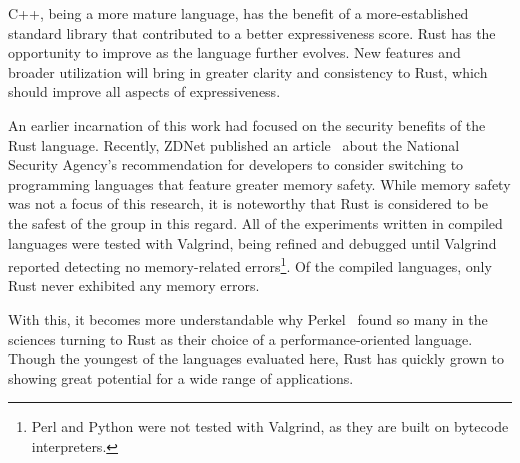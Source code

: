 C++, being a more mature language, has the benefit of a more-established standard library that contributed to a better expressiveness score. Rust has the opportunity to improve as the language further evolves. New features and broader utilization will bring in greater clarity and consistency to Rust, which should improve all aspects of expressiveness. 

An earlier incarnation of this work had focused on the security benefits of the Rust language. Recently, ZDNet published an article~\cite{tung} about the National Security Agency's recommendation for developers to consider switching to programming languages that feature greater memory safety. While memory safety was not a focus of this research, it is noteworthy that Rust is considered to be the safest of the group in this regard. All of the experiments written in compiled languages were tested with Valgrind, being refined and debugged until Valgrind reported detecting no memory-related errors\footnote{Perl and Python were not tested with Valgrind, as they are built on bytecode interpreters.}. Of the compiled languages, only Rust never exhibited any memory errors.

With this, it becomes more understandable why Perkel~\cite{nature} found so many in the sciences turning to Rust as their choice of a performance-oriented language. Though the youngest of the languages evaluated here, Rust has quickly grown to showing great potential for a wide range of applications.
